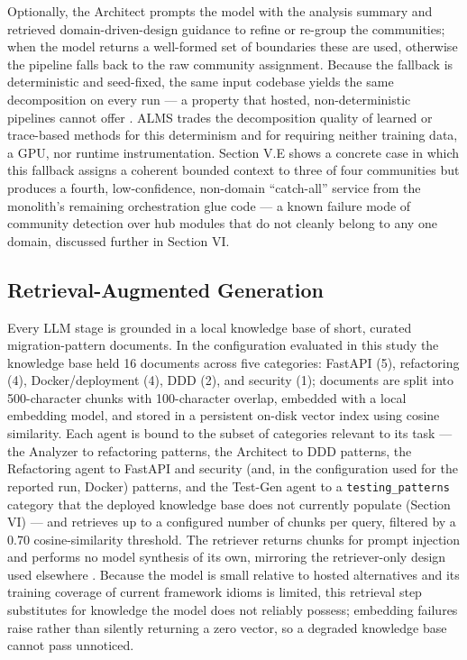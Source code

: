 \documentclass[conference]{IEEEtran}
\begin{document}
Optionally, the Architect prompts the model with the analysis summary and retrieved domain-driven-design guidance to refine or re-group the communities; when the model returns a well-formed set of boundaries these are used, otherwise the pipeline falls back to the raw community assignment. Because the fallback is deterministic and seed-fixed, the same input codebase yields the same decomposition on every run --- a property that hosted, non-deterministic pipelines cannot offer \cite{chen2026}. ALMS trades the decomposition quality of learned or trace-based methods \cite{sellami2025,kalia2021} for this determinism and for requiring neither training data, a GPU, nor runtime instrumentation. Section V.E shows a concrete case in which this fallback assigns a coherent bounded context to three of four communities but produces a fourth, low-confidence, non-domain ``catch-all'' service from the monolith's remaining orchestration glue code --- a known failure mode of community detection over hub modules that do not cleanly belong to any one domain, discussed further in Section VI.

\subsection{Retrieval-Augmented Generation}

Every LLM stage is grounded in a local knowledge base of short, curated migration-pattern documents. In the configuration evaluated in this study the knowledge base held 16 documents across five categories: FastAPI (5), refactoring (4), Docker/deployment (4), DDD (2), and security (1); documents are split into 500-character chunks with 100-character overlap, embedded with a local embedding model, and stored in a persistent on-disk vector index using cosine similarity. Each agent is bound to the subset of categories relevant to its task --- the Analyzer to refactoring patterns, the Architect to DDD patterns, the Refactoring agent to FastAPI and security (and, in the configuration used for the reported run, Docker) patterns, and the Test-Gen agent to a \texttt{testing\_patterns} category that the deployed knowledge base does not currently populate (Section VI) --- and retrieves up to a configured number of chunks per query, filtered by a 0.70 cosine-similarity threshold. The retriever returns chunks for prompt injection and performs no model synthesis of its own, mirroring the retriever-only design used elsewhere \cite{chen2026,zan2023}. Because the model is small relative to hosted alternatives and its training coverage of current framework idioms is limited, this retrieval step substitutes for knowledge the model does not reliably possess; embedding failures raise rather than silently returning a zero vector, so a degraded knowledge base cannot pass unnoticed.
\end{document}
